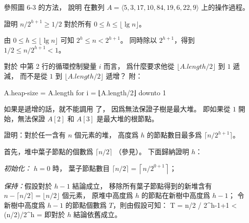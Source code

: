 \startsection[
  title={Building heap},
]

\startEXERCISE
參照圖 6-3 的方法，
說明  在數列 $A = \langle 5, 3, 17, 10, 84, 19, 6, 22, 9 \rangle$ 上的操作過程。
\stopEXERCISE

\startANSWER
\startcombination[3*2]
{\externalfigure[output/e6_3_1-1]}{}
{\externalfigure[output/e6_3_1-2]}{}
{\externalfigure[output/e6_3_1-3]}{}
{\externalfigure[output/e6_3_1-4]}{}
{\externalfigure[output/e6_3_1-5]}{}
{}{}
\stopcombination
\stopANSWER

\startEXERCISE
證明 $n/2^{h+1} \ge 1/2$ 對於所有 $0\le h\le \lfloor \lg n\rfloor$。
\stopEXERCISE

\startANSWER
由 $0\le h\le \lfloor \lg n\rfloor$ 可知 $2^h \le n < 2^{h+1}$。
同時除以 $2^{h+1}$，得到 $1/2 \le n/2^{h+1} < 1$。
\stopANSWER

\startEXERCISE
對於  中第 2 行的循環控制變量 $i$ 而言，
爲什麼要求他從 $\lfloor A.length/2 \rfloor$ 到 $1$ 遞減，
而不是從 $1$ 到 $\lfloor A.length/2 \rfloor$ 遞增？
附：

\startCLRSCODE
A.heap-size = A.length
for i =  ⌊A.length/2⌋ downto 1
\stopCLRSCODE
\stopEXERCISE

\startANSWER
如果是遞增的話，就不能調用  了，
因爲無法保證子樹是最大堆。
即如果從 $1$ 開始，無法保證 $A[2]$ 和 $A[3]$ 是最大堆的根節點。
\stopANSWER

\startEXERCISE
證明：對於任一含有 $n$ 個元素的堆，
高度爲 $h$ 的節點數目最多爲 $\lceil n/2^{h+1} \rceil$。
\stopEXERCISE

\startANSWER
首先，堆中葉子節點的個數爲 $\lceil n/2 \rceil$ （參見）。
下面歸納證明 $h$：

\emph{初始化：} $h = 0$ 時，
葉子節點數目 $\lceil n/2 \rceil = \left\lceil n/2^{0+1} \right\rceil$；

\emph{保持：}假設對於 $h - 1$ 結論成立，
移除所有葉子節點得到的新堆含有 $n-\lceil n/2 \rceil = \lfloor n/2 \rfloor$ 個元素，
原堆中高度爲 $h$ 的節點在新樹中高度爲 $h-1$；
令新樹中高度爲 $h-1$ 的節點個數爲 $T$，則由假設可知：
\startsplitformula\startmathalignment
\NC T \NC = \lceil \lfloor n/2 \rfloor / 2^{h-1+1} \rceil \NR
\NC \NC < \lceil (n/2)/2^h \rceil \NR
\NC \NC = \left\lceil {} \right\rceil \NR
\stopmathalignment\stopsplitformula
即對於 $h$ 結論依舊成立。
\stopANSWER

\stopsection
